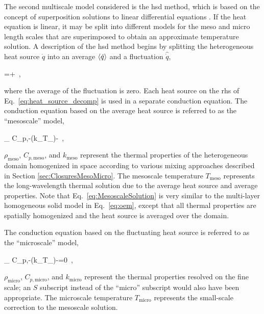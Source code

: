 The second multiscale model considered is the \gls{hsd} method, which is based on the concept of superposition solutions to linear differential equations \cite{stainsby}. If the heat equation is linear, it may be split into different models for the meso and micro length scales that are superimposed to obtain an approximate temperature solution. A description of the \gls{hsd} method begins by splitting the heterogeneous heat source \(\dot{q}\) into an average \(\langle\dot{q}\rangle\) and a fluctuation \(\hat{\dot{q}}\),

\beq
\label{eq:heat_source_decomp}
=\la{}\ra+\ ,
\eeq

\noindent where the average of the fluctuation is zero. Each heat source on the \gls{rhs} of Eq.\ \eqref{eq:heat_source_decomp} is used in a separate conduction equation. The conduction equation based on the average heat source is referred to as the ``mesoscale'' model,

\beq
\label{eq:MesoscaleSolution}
\rho_ C_{p,}-\nabla\cdot(k_\nabla T_)-\la{}\ ,
\eeq

\noindent \(\rho_\text{meso}\), \(C_{p,\text{meso}}\), and \(k_\text{meso}\) represent the thermal properties of the heterogeneous domain homogenized in space according to various mixing approaches described in Section \ref{sec:ClosuresMesoMicro}. The mesoscale temperature \(T_\text{meso}\) represents the long-wavelength thermal solution due to the average heat source and average properties. Note that Eq.\ \eqref{eq:MesoscaleSolution} is very similar to the multi-layer homogeneous solid model in Eq.\ \eqref{eq:oem}, except that all thermal properties are spatially homogenized and the heat source is averaged over the domain.

The conduction equation based on the fluctuating heat source is referred to as the ``microscale'' model,

\beq
\label{eq:MicroscaleSolution}
\rho_ C_{p,}-\nabla\cdot(k_\nabla T_)-=0\ ,
\eeq

\noindent \(\rho_\text{micro}\), \(C_{p,\text{micro}}\), and \(k_\text{micro}\) represent the thermal properties resolved on the fine scale; an \(S\) subscript instead of the ``micro'' subscript would also have been appropriate. The microscale temperature \(T_\text{micro}\) represents the small-scale correction to the mesoscale solution.


